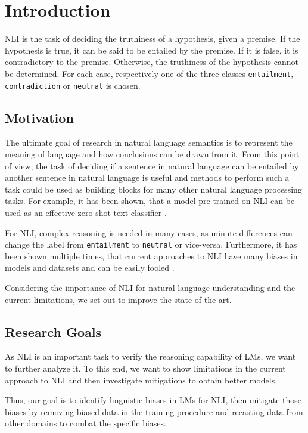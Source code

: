 \section{Introduction}


\ac{NLI} is the task of deciding the truthiness of a hypothesis, given a premise. If the hypothesis is true, it can be said to be entailed by the premise. If it is false, it is contradictory to the premise. Otherwise, the truthiness of the hypothesis cannot be determined. For each case, respectively one of the three classes \texttt{entailment}, \texttt{contradiction} or \texttt{neutral} is chosen.

\subsection{Motivation}
The ultimate goal of research in natural language semantics is to represent the meaning of language and how conclusions can be drawn from it. From this point of view, the task of deciding if a sentence in natural language can be entailed by another sentence in natural language is useful and methods to perform such a task could be used as building blocks for many other natural language processing tasks. For example, it has been shown, that a model pre-trained on \ac{NLI} can be used as an effective zero-shot text classifier \cite{yin-etal-2019-benchmarking}.

For \ac{NLI}, complex reasoning is needed in many cases, as minute differences can change the label from \texttt{entailment} to \texttt{neutral} or vice-versa. Furthermore, it has been shown multiple times, that current approaches to \ac{NLI} have many biases in models and datasets and can be easily fooled \cite{hyponly,gururangan-etal-2018-annotation,glockner-etal-2018-breaking}.

Considering the importance of \ac{NLI} for natural language understanding and the current limitations, we set out to improve the state of the art.

\subsection{Research Goals}
As \ac{NLI} is an important task to verify the reasoning capability of \acp{LM}, we want to further analyze it. To this end, we want to show limitations in the current approach to \ac{NLI} and then investigate mitigations to obtain better models.

Thus, our goal is to identify linguistic biases in \acp{LM} for \ac{NLI}, then mitigate those biases by removing biased data in the training procedure and recasting data from other domains to combat the specific biases.
\vspace{1em}

